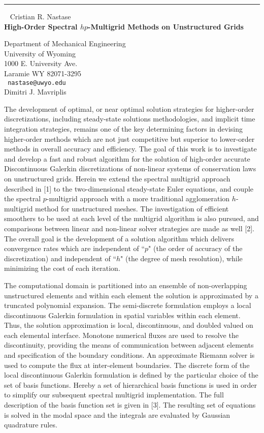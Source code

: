 \documentclass{report}
\begin{document}
\begin{center}

\rule{6in}{1pt} \
{\large
Cristian R. Nastase
\\ {\bf
High-Order Spectral $hp$-Multigrid Methods on Unstructured Grids
}}


Department of Mechanical Engineering \\
University of Wyoming \\
1000 E. University Ave. \\
Laramie WY 82071-3295 
\\ {\tt
nastase@uwyo.edu
}
\\
Dimitri J. Mavriplis
\end{center}

The development of optimal, or near optimal solution strategies for
higher-order discretizations, including steady-state solutions
methodologies, and implicit time integration strategies, remains one of
the key determining factors in devising higher-order methods which are
not just competitive but superior to lower-order methods in overall
accuracy and efficiency. The goal of this work is to investigate and
develop a fast and robust algorithm for the solution of high-order
accurate Discontinuous Galerkin discretizations of non-linear systems
of conservation laws on unstructured grids. Herein we extend the
spectral multigrid approach described in [1] to the two-dimensional
steady-state Euler equations, and couple the spectral $p$-multigrid
approach with a more traditional agglomeration $h$-multigrid method for
unstructured meshes. The investigation of efficient smoothers to be
used at each level of the multigrid algorithm is also pursued, and
comparisons between linear and non-linear solver strategies are made as
well [2]. The overall goal is the development of a solution algorithm
which delivers convergence rates which are independent of ``$p$" (the
order of accuracy of the discretization) and independent of ``$h$" (the
degree of mesh resolution), while minimizing the cost of each
iteration.

The computational domain is partitioned into an ensemble of
non-overlapping unstructured elements and within each element the
solution is approximated by a truncated polynomial expansion. The
semi-discrete formulation employs a local discontinuous Galerkin
formulation in spatial variables within each element. Thus, the
solution approximation is local, discontinuous, and doubled valued on
each elemental interface. Monotone numerical fluxes are used to resolve
the discontinuity, providing the means of communication between
adjacent elements and specification of the boundary conditions. An
approximate Riemann solver is used to compute the flux at inter-element
boundaries. The discrete form of the local discontinuous Galerkin
formulation is defined by the particular choice of the set of basis
functions. Hereby a set of hierarchical basis functions is used in
order to simplify our subsequent spectral multigrid implementation. The
full description of the basis function set is given in [3]. The
resulting set of equations is solved in the modal space and the
integrals are evaluated by Gaussian quadrature rules.
\end{document}
